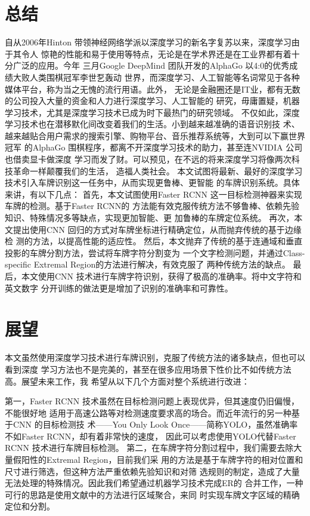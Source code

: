 \section{总结}

自从2006年Hinton 带领神经网络学派以深度学习的新名字复苏以来，深度学习由于其令人
惊艳的性能和易于使用等特点，无论是在学术界还是在工业界都有着十分广泛的应用。今年
三月Google DeepMind 团队开发的AlphaGo 以4:0的优秀成绩大败人类围棋冠军李世乭轰动
世界，而深度学习、人工智能等名词常见于各种媒体平台，称为当之无愧的流行用语。此外，
无论是金融圈还是IT业，都有无数的公司投入大量的资金和人力进行深度学习、人工智能的
研究，毋庸置疑，机器学习技术，尤其是深度学习技术已成为时下最热门的研究领域。
不仅如此，深度学习技术也在潜移默化间改变着我们的生活。小到越来越准确的语音识别技
术、越来越贴合用户需求的搜索引擎、购物平台、音乐推荐系统等，大到可以下赢世界冠军
的AlphaGo 围棋程序，都离不开深度学习技术的助力，甚至连NVIDIA 公司也借卖显卡做深度
学习而发了财。可以预见，在不远的将来深度学习将像两次科技革命一样颠覆我们的生活，
造福人类社会。
本文试图将最新、最好的深度学习技术引入车牌识别这一任务中，从而实现更鲁棒、更智能
的车牌识别系统。具体来讲，有以下几点：
首先，本文试图使用Faster RCNN 这一目标检测神器来实现车牌的检测。基于Faster RCNN的
方法能有效克服传统方法不够鲁棒、依赖先验知识、特殊情况多等缺点，实现更加智能、更
加鲁棒的车牌定位系统。
再次，本文提出使用CNN 回归的方式对车牌坐标进行精确定位，从而抛弃传统的基于边缘检
测的方法，以提高性能的适应性。
然后，本文抛弃了传统的基于连通域和垂直投影的车牌分割方法，尝试将车牌字符分割变为
一个文字检测问题，并通过Class-specific Extremal Region的方法进行解决，有效克服了
两种传统方法的缺点。
最后，本文使用CNN 技术进行车牌字符识别，获得了极高的准确率。将中文字符和英文数字
分开训练的做法更是增加了识别的准确率和可靠性。

\section{展望}

本文虽然使用深度学习技术进行车牌识别，克服了传统方法的诸多缺点，但也可以看到深度
学习方法也不是完美的，甚至在很多应用场景下性价比不如传统方法高。展望未来工作，我
希望从以下几个方面对整个系统进行改进：

第一，Faster RCNN 技术虽然在目标检测问题上表现优异，但其速度仍旧偏慢，不能很好地
适用于高速公路等对检测速度要求高的场合。而近年流行的另一种基于CNN 的目标检测技
术——You Only Look Once——简称YOLO，虽然准确率不如Faster RCNN，却有着非常快的速度，
因此可以考虑使用YOLO代替Faster RCNN 技术进行车牌目标检测。
第二，在车牌字符分割过程中，我们需要去除大量假阳性的Extremal Region，目前我们采
用的方法是基于车牌字符的相对位置和尺寸进行筛选，但这种方法严重依赖先验知识和对筛
选规则的制定，造成了大量无法处理的特殊情况。因此我们希望通过机器学习技术完成ER的
合并工作，一种可行的思路是使用文献\cite{Gomez:2014vp}中的方法进行区域聚合，来同
时实现车牌文字区域的精确定位和分割。